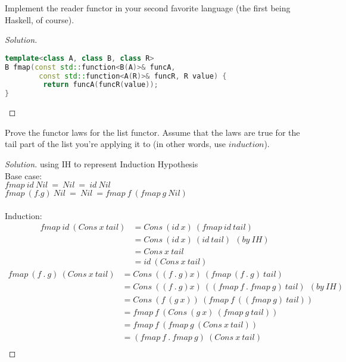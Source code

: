 \documentclass[7x10,thmnumcontwithchapter,WebLink,AddlevelTwoTOC,NumRef,BookEndNote,printer]{pupbook}
\begin{document}
\begin{exercise}
Implement the reader functor in your second favorite language (the first being Haskell, of course).
\end{exercise}

\begin{proof}[Solution]
~\\
\begin{lstlisting}[language=C++]
template<class A, class B, class R>
B fmap(const std::function<B(A)>& funcA, 
        const std::function<A(R)>& funcR, R value) {
         return funcA(funcR(value));
}
\end{lstlisting}
\end{proof}


\begin{exercise}
Prove the functor laws for the list functor. Assume that the laws are true for the tail part of the list you’re applying it to (in other words, use $induction$).
\end{exercise}

\begin{proof}[Solution]
using IH to represent Induction  Hypothesis \\
Base case:  \\
\hspace*{2cm} $ fmap \ id \ Nil \ =  \ Nil \ = \ id \ Nil$ \\
\hspace*{2cm} $ fmap \ (f . g) \ Nil \ = \ Nil \ = fmap \ f \ (fmap \ g \ Nil)$ \\
~\\
Induction:  \\
\begin{align*}
fmap \ id \ (Cons \ x \ tail) &= Cons \ (id \ x) \ (fmap \ id \ tail) \\
                              &= Cons \ (id \ x) \ (id \ tail) \ \ (by \ IH) \\
                              &= Cons \ x  \ tail \\ 
                              &=id \ (Cons \ x \ tail)
\end{align*}
\begin{align*}
fmap \ (f \ . \ g) \ (Cons \ x \ tail) &= Cons \ ((f \ . \ g) x) \ (fmap \ (f \ . \ g) \ tail)   \\
                                       &= Cons \ ((f \ . \ g) x) \ ((fmap \ f \ . \ fmap \ g) \ tail) \ \ (by \ IH)  \\
                                        &= Cons \ (f \ (g \ x)) \ (fmap \ f \  ((fmap \ g) \ tail))   \\
                                       &= fmap \ f \ (Cons \ (g \ x) \ (fmap \ g \ tail))  \\
                                       &= fmap \ f \ (fmap \ g \ (Cons \ x \ tail))  \\
                                       &= (fmap \ f \ . \ fmap \ g) \ (Cons \ x \ tail) \\
\end{align*}
\end{proof}
\end{document}
